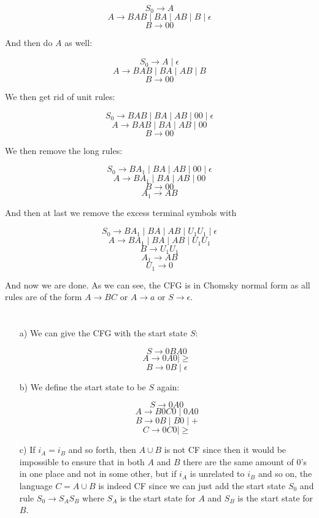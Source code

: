 \documentclass{article}
\begin{document}
		\[S_0\rightarrow A\]
		\[A\rightarrow BAB\mid BA\mid AB\mid B\mid \epsilon\]
		\[B\rightarrow 00\]

		And then do $A$ as well:

		\[S_0\rightarrow A\mid \epsilon\]
		\[A\rightarrow BAB\mid BA\mid AB\mid B\]
		\[B\rightarrow 00\]

		We then get rid of unit rules:

		\[S_0\rightarrow BAB\mid BA\mid AB\mid 00\mid \epsilon\]
		\[A\rightarrow BAB\mid BA\mid AB\mid 00\]
		\[B\rightarrow 00\]

		We then remove the long rules:

		\[S_0\rightarrow BA_1\mid BA\mid AB\mid 00\mid \epsilon\]
		\[A\rightarrow BA_1\mid BA\mid AB\mid 00\]
		\[B\rightarrow 00\]
		\[A_1\rightarrow AB\]

		And then at last we remove the excess terminal symbols with

		\[S_0\rightarrow BA_1\mid BA\mid AB\mid U_1U_1\mid \epsilon\]
		\[A\rightarrow BA_1\mid BA\mid AB\mid U_1U_1\]
		\[B\rightarrow U_1U_1\]
		\[A_1\rightarrow AB\]
		\[U_1\rightarrow 0\]

		And now we are done. As we can see, the CFG is in Chomsky normal 
		form as all rules are of the form $A\rightarrow BC$ or 
		$A\rightarrow a$ or $S\rightarrow\epsilon$.

		\section{}

		\begin{itemize}
			\item[a)] We can give the CFG with the start state $S$:

					\[S\rightarrow 0BA0\]
					\[A\rightarrow 0A0\mid \geq\]
					\[B\rightarrow 0B\mid \epsilon\]
			\item[b)] We define the start state to be $S$ again:

				\[S\rightarrow 0A0\]
				\[A\rightarrow B0C0\mid 0A0\]
				\[B\rightarrow 0B\mid B0\mid +\]
				\[C\rightarrow 0C0\mid \geq\]
			\item[c)] If $i_A = i_B$ and so forth, then $A\cup B$ is not 
				CF since then it would be impossible to ensure that in 
				both $A$ and $B$ there are the same amount of $0$'s in one 
				place and not in some other, but if $i_A$ is unrelated to 
				$i_B$ and so on, the language $C= A\cup B$ is indeed CF 
				since we can just add the start state $S_0$ and rule 
				$S_0 \rightarrow S_AS_B$ where $S_A$ is the start state for 
				$A$ and $S_B$ is the start state for $B$. 
		\end{itemize}
\end{document}

